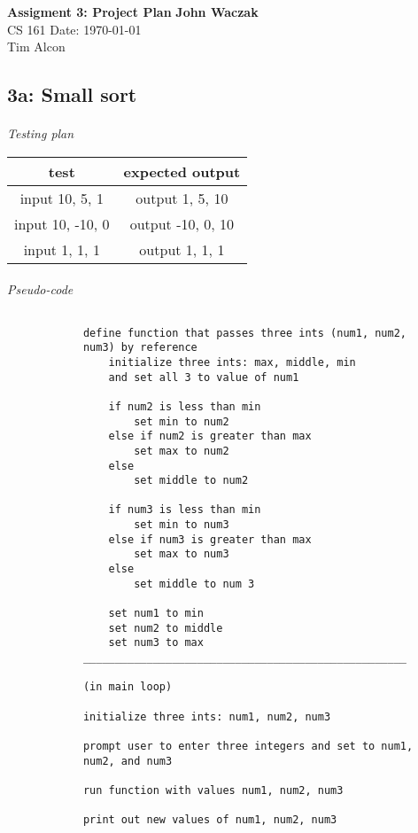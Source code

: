 \documentclass[a4paper, 11pt]{article}
\begin{document}
\noindent
\large\textbf{Assigment 3: Project Plan} \hfill \textbf{John Waczak} \\
\normalsize CS 161 \hfill  Date: \today \\
Tim Alcon \\


\subsection*{3a: Small sort}
	\paragraph{}
		\textit{Testing plan}\\
	
		\begin{center}
			\begin{tabular}{|c|c|}
				\hline
				\textbf{test} & \textbf{expected output} \\ 
				\hline 
				input 10, 5, 1 & output 1, 5, 10 \\ 
				\hline
				input 10, -10, 0 & output -10, 0, 10 \\ 
				\hline
				input 1, 1, 1 & output 1, 1, 1 \\ 
				\hline
			\end{tabular}
		\end{center}
	
	\paragraph{}
		\textit{Pseudo-code} 
		\begin{lstlisting}
		
			define function that passes three ints (num1, num2,
			num3) by reference
				initialize three ints: max, middle, min 
				and set all 3 to value of num1
				
				if num2 is less than min
					set min to num2
				else if num2 is greater than max
					set max to num2 
				else 
					set middle to num2 
				
				if num3 is less than min
					set min to num3 
				else if num3 is greater than max
					set max to num3 
				else 
					set middle to num 3 
					
				set num1 to min 
				set num2 to middle 
				set num3 to max 
			___________________________________________________		
			
			(in main loop)
			
			initialize three ints: num1, num2, num3 
			
			prompt user to enter three integers and set to num1, 
			num2, and num3
			
			run function with values num1, num2, num3
			
			print out new values of num1, num2, num3
			 
		\end{lstlisting}
\end{document}
